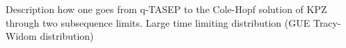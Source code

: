 Description how one goes from q-TASEP to the Cole-Hopf solution of KPZ through two subsequence limits. Large time limiting distribution (GUE Tracy-Widom distribution)